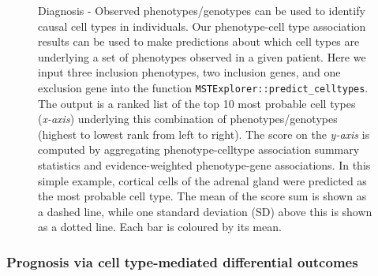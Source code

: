 \documentclass[
sn-nature
]{sn-jnl}
\begin{document}
\label{cell-fig-diagnosis}
\begin{figure}[H]


\caption{\label{fig-diagnosis}Diagnosis - Observed phenotypes/genotypes
can be used to identify causal cell types in individuals. Our
phenotype-cell type association results can be used to make predictions
about which cell types are underlying a set of phenotypes observed in a
given patient. Here we input three inclusion phenotypes, two inclusion
genes, and one exclusion gene into the function
\texttt{MSTExplorer::predict\_celltypes}. The output is a ranked list of
the top 10 most probable cell types (\emph{x-axis}) underlying this
combination of phenotypes/genotypes (highest to lowest rank from left to
right). The score on the \emph{y-axis} is computed by aggregating
phenotype-celltype association summary statistics and evidence-weighted
phenotype-gene associations. In this simple example, cortical cells of
the adrenal gland were predicted as the most probable cell type. The
mean of the score sum is shown as a dashed line, while one standard
deviation (SD) above this is shown as a dotted line. Each bar is
coloured by its mean.}

\end{figure}%

\subsubsection{Prognosis via cell type-mediated differential
outcomes}\label{prognosis-via-cell-type-mediated-differential-outcomes}
\end{document}
